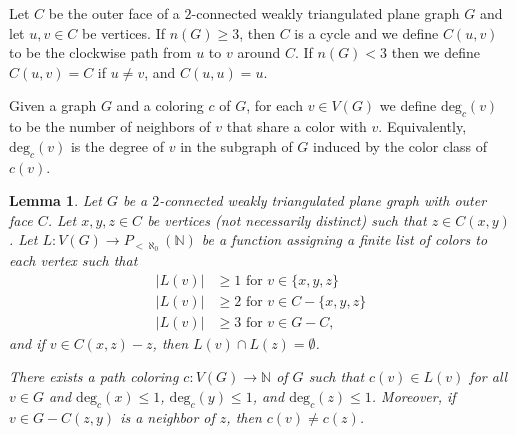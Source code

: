 \documentclass[12pt,letterpaper]{article}
\theoremstyle{plain}
\newtheorem{lemma}{Lemma}[section]           %
\theoremstyle{definition}
\theoremstyle{break}
\begin{document}
Let $C$ be the outer face of a $2$-connected weakly triangulated plane graph
$G$ and let $u,v\in C$ be vertices.
If $n(G)\ge3$, then $C$ is a cycle and we
define $C(u,v)$ to be the clockwise path
from $u$ to $v$ around $C$. If $n(G)<3$ then we define $C(u,v)=C$ if
$u\ne v$, and $C(u,u)=u$.

Given a graph $G$ and a coloring $c$ of $G$, for each $v\in V(G)$ we
define $\text{deg}_c(v)$ to be the number of neighbors of $v$ that share a color
with $v$. Equivalently, $\text{deg}_c(v)$ is the degree of $v$ in the subgraph
of $G$ induced by the color class of $c(v)$.

\begin{lemma}\label{L:hartman3}
Let $G$ be a $2$-connected weakly triangulated plane graph with outer face
$C$. Let $x,y,z\in C$ be vertices (not necessarily distinct) such that
$z\in C(x,y)$. Let $L:V(G)\to P_{<\aleph_0}(\mathbb{N})$ be a
function assigning a finite list of colors to
each vertex such that
\begin{align*}
    |L(v)| &\ge 1 \text{ for } v\in\{x,y,z\} \\
    |L(v)| &\ge 2 \text{ for } v\in C-\{x,y,z\} \\
    |L(v)| &\ge 3 \text{ for } v\in G-C,
\end{align*}
and if $v\in C(x,z)-z$, then $L(v)\cap L(z)=\emptyset$.

There exists a path coloring $c:V(G)\to\mathbb{N}$ of $G$ such
that $c(v)\in L(v)$ for all $v\in G$ and $\text{deg}_c(x)\le 1$,
$\text{deg}_c(y)\le 1$, and $\text{deg}_c(z)\le 1$. Moreover,
if $v\in G-C(z,y)$ is a neighbor of $z$, then $c(v)\ne c(z)$.
\end{lemma}
\end{document}
